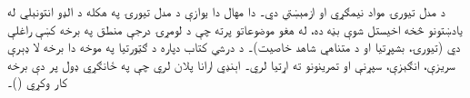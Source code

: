 \documentclass[../../include/open-logic-part]{subfiles}
\begin{document}

\begin{editorial}
  د مدل تيورۍ مواد نيمګړي او ازمېښتي دي۔ دا مهال دا يوازې د مدل
  تيورۍ په هکله د الډو انتونېلي له يادښتونو څخه اخيستل شوې بڼه ده، له
  هغو موضوعاتو پرته چې د لومړۍ درجې منطق په برخه کښې راغلې دي (تيورۍ،
  بشپړتيا او د متناهي شاهد خاصيت)۔ د درسي کتاب دپاره د ګټورتيا په موخه
  دا برخه لا ډېرې سريزې، انګېزې، سپړنې او تمرينونو ته اړتيا لري۔ اېنډي
  ارانا پلان لري چې په ځانګړي ډول پر دې برخه کار وکړي ()۔
\end{editorial}





\OLEndPartHook
\end{document}
